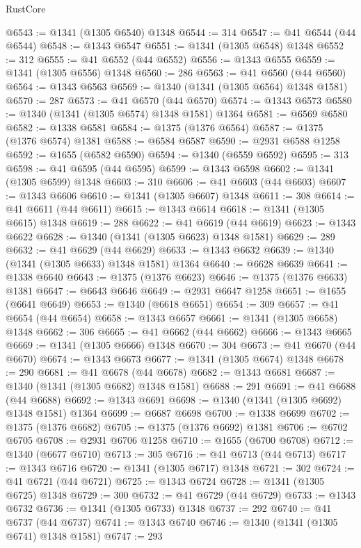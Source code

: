 \begin{lexlean}{RustCore}
\begin{coremodule}
@6543 := @1341 (@1305 @6540) @1348
@6544 := 314
@6547 := @41 @6544 (@44 @6544)
@6548 := @1343 @6547
@6551 := @1341 (@1305 @6548) @1348
@6552 := 312
@6555 := @41 @6552 (@44 @6552)
@6556 := @1343 @6555
@6559 := @1341 (@1305 @6556) @1348
@6560 := 286
@6563 := @41 @6560 (@44 @6560)
@6564 := @1343 @6563
@6569 := @1340 (@1341 (@1305 @6564) @1348 @1581)
@6570 := 287
@6573 := @41 @6570 (@44 @6570)
@6574 := @1343 @6573
@6580 := @1340 (@1341 (@1305 @6574) @1348 @1581) @1364
@6581 := @6569 @6580
@6582 := @1338 @6581
@6584 := @1375 (@1376 @6564)
@6587 := @1375 (@1376 @6574) @1381
@6588 := @6584 @6587
@6590 := @2931 @6588 @1258
@6592 := @1655 (@6582 @6590)
@6594 := @1340 (@6559 @6592)
@6595 := 313
@6598 := @41 @6595 (@44 @6595)
@6599 := @1343 @6598
@6602 := @1341 (@1305 @6599) @1348
@6603 := 310
@6606 := @41 @6603 (@44 @6603)
@6607 := @1343 @6606
@6610 := @1341 (@1305 @6607) @1348
@6611 := 308
@6614 := @41 @6611 (@44 @6611)
@6615 := @1343 @6614
@6618 := @1341 (@1305 @6615) @1348
@6619 := 288
@6622 := @41 @6619 (@44 @6619)
@6623 := @1343 @6622
@6628 := @1340 (@1341 (@1305 @6623) @1348 @1581)
@6629 := 289
@6632 := @41 @6629 (@44 @6629)
@6633 := @1343 @6632
@6639 := @1340 (@1341 (@1305 @6633) @1348 @1581) @1364
@6640 := @6628 @6639
@6641 := @1338 @6640
@6643 := @1375 (@1376 @6623)
@6646 := @1375 (@1376 @6633) @1381
@6647 := @6643 @6646
@6649 := @2931 @6647 @1258
@6651 := @1655 (@6641 @6649)
@6653 := @1340 (@6618 @6651)
@6654 := 309
@6657 := @41 @6654 (@44 @6654)
@6658 := @1343 @6657
@6661 := @1341 (@1305 @6658) @1348
@6662 := 306
@6665 := @41 @6662 (@44 @6662)
@6666 := @1343 @6665
@6669 := @1341 (@1305 @6666) @1348
@6670 := 304
@6673 := @41 @6670 (@44 @6670)
@6674 := @1343 @6673
@6677 := @1341 (@1305 @6674) @1348
@6678 := 290
@6681 := @41 @6678 (@44 @6678)
@6682 := @1343 @6681
@6687 := @1340 (@1341 (@1305 @6682) @1348 @1581)
@6688 := 291
@6691 := @41 @6688 (@44 @6688)
@6692 := @1343 @6691
@6698 := @1340 (@1341 (@1305 @6692) @1348 @1581) @1364
@6699 := @6687 @6698
@6700 := @1338 @6699
@6702 := @1375 (@1376 @6682)
@6705 := @1375 (@1376 @6692) @1381
@6706 := @6702 @6705
@6708 := @2931 @6706 @1258
@6710 := @1655 (@6700 @6708)
@6712 := @1340 (@6677 @6710)
@6713 := 305
@6716 := @41 @6713 (@44 @6713)
@6717 := @1343 @6716
@6720 := @1341 (@1305 @6717) @1348
@6721 := 302
@6724 := @41 @6721 (@44 @6721)
@6725 := @1343 @6724
@6728 := @1341 (@1305 @6725) @1348
@6729 := 300
@6732 := @41 @6729 (@44 @6729)
@6733 := @1343 @6732
@6736 := @1341 (@1305 @6733) @1348
@6737 := 292
@6740 := @41 @6737 (@44 @6737)
@6741 := @1343 @6740
@6746 := @1340 (@1341 (@1305 @6741) @1348 @1581)
@6747 := 293

\end{coremodule}
\end{lexlean}
